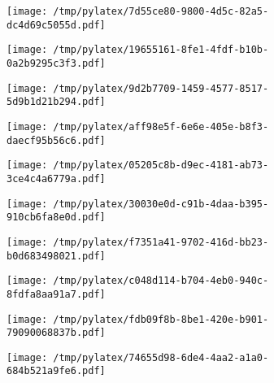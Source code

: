 \documentclass{article}
\begin{document}
\begin{figure}[htbp]
\begin{subfigure}[b]{.3\linewidth}
\texttt{[image: /tmp/pylatex/7d55ce80-9800-4d5c-82a5-dc4d69c5055d.pdf]}
\end{subfigure}
\begin{subfigure}[b]{.3\linewidth}
\texttt{[image: /tmp/pylatex/19655161-8fe1-4fdf-b10b-0a2b9295c3f3.pdf]}
\end{subfigure}
\begin{subfigure}[b]{.3\linewidth}
\texttt{[image: /tmp/pylatex/9d2b7709-1459-4577-8517-5d9b1d21b294.pdf]}
\end{subfigure}
\begin{subfigure}[b]{.3\linewidth}
\texttt{[image: /tmp/pylatex/aff98e5f-6e6e-405e-b8f3-daecf95b56c6.pdf]}
\end{subfigure}
\begin{subfigure}[b]{.3\linewidth}
\texttt{[image: /tmp/pylatex/05205c8b-d9ec-4181-ab73-3ce4c4a6779a.pdf]}
\end{subfigure}
\begin{subfigure}[b]{.3\linewidth}
\texttt{[image: /tmp/pylatex/30030e0d-c91b-4daa-b395-910cb6fa8e0d.pdf]}
\end{subfigure}
\begin{subfigure}[b]{.3\linewidth}
\texttt{[image: /tmp/pylatex/f7351a41-9702-416d-bb23-b0d683498021.pdf]}
\end{subfigure}
\begin{subfigure}[b]{.3\linewidth}
\texttt{[image: /tmp/pylatex/c048d114-b704-4eb0-940c-8fdfa8aa91a7.pdf]}
\end{subfigure}
\begin{subfigure}[b]{.3\linewidth}
\texttt{[image: /tmp/pylatex/fdb09f8b-8be1-420e-b901-79090068837b.pdf]}
\end{subfigure}
\begin{subfigure}[b]{.3\linewidth}
\texttt{[image: /tmp/pylatex/74655d98-6de4-4aa2-a1a0-684b521a9fe6.pdf]}
\end{subfigure}
\end{figure}
\end{document}
